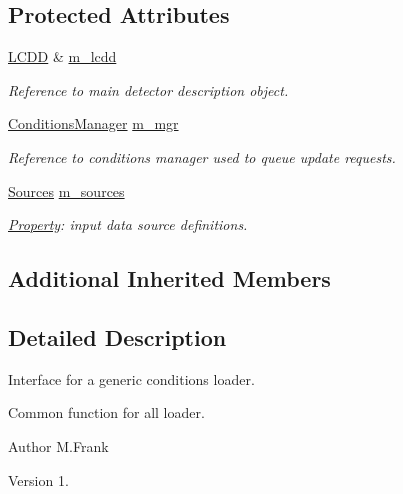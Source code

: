 \subsection*{Protected Attributes}
\begin{DoxyCompactItemize}
\item 
\hyperlink{class_d_d4hep_1_1_geometry_1_1_l_c_d_d}{L\+C\+DD} \& \hyperlink{class_d_d4hep_1_1_conditions_1_1_conditions_data_loader_a6920143ee0788f253031a3d0a25e2d0f}{m\+\_\+lcdd}
\begin{DoxyCompactList}\small\item\em Reference to main detector description object. \end{DoxyCompactList}\item 
\hyperlink{class_d_d4hep_1_1_conditions_1_1_conditions_manager}{Conditions\+Manager} \hyperlink{class_d_d4hep_1_1_conditions_1_1_conditions_data_loader_a470c95c837745118517cc86bdc668346}{m\+\_\+mgr}
\begin{DoxyCompactList}\small\item\em Reference to conditions manager used to queue update requests. \end{DoxyCompactList}\item 
\hyperlink{class_d_d4hep_1_1_conditions_1_1_conditions_data_loader_a10469a47fdf0b7949194f79c35ee9510}{Sources} \hyperlink{class_d_d4hep_1_1_conditions_1_1_conditions_data_loader_a1f27d2cb0eb76ecfb39322fb08343b31}{m\+\_\+sources}
\begin{DoxyCompactList}\small\item\em \hyperlink{class_d_d4hep_1_1_property}{Property}\+: input data source definitions. \end{DoxyCompactList}\end{DoxyCompactItemize}
\subsection*{Additional Inherited Members}


\subsection{Detailed Description}
Interface for a generic conditions loader. 

Common function for all loader.

\begin{DoxyAuthor}{Author}
M.\+Frank 
\end{DoxyAuthor}
\begin{DoxyVersion}{Version}
1. 
\end{DoxyVersion}


